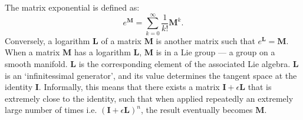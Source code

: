         The matrix exponential is defined as:
        \begin{equation}
          e^{\mathbf{M}} = \sum_{k=0}^{\infty}\frac{1}{k!}\mathbf{M}^k. \label{eqn:matrix_exponential}
        \end{equation}
        Conversely, a logarithm $\mathbf{L}$ of a matrix $\mathbf{M}$ is another matrix such that $e^\mathbf{L} = \mathbf{M}$. When a matrix $\mathbf{M}$ has a logarithm $\mathbf{L}$, $\mathbf{M}$ is in a Lie group --- a group on a smooth manifold. $\mathbf{L}$ is the corresponding element of the associated Lie algebra. $\mathbf{L}$ is an `infinitessimal generator', and its value determines the tangent space at the identity $\mathbf{I}$. Informally, this means that there exists a matrix $\mathbf{I} + \epsilon \mathbf{L}$ that is extremely close to the identity, such that when applied repeatedly an extremely large number of times i.e. $(\mathbf{I} + \epsilon \mathbf{L})^n$, the result eventually becomes $\mathbf{M}$.
        
